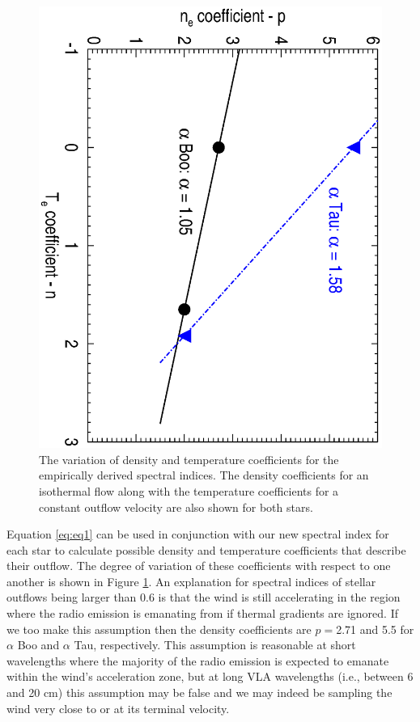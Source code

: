 \documentclass[iop]{emulateapj}
\begin{document}
\begin{figure}
\includegraphics[trim = 0mm 10mm 0mm 20mm, clip,scale=0.385,angle=90]{fig4.ps}
\caption{The variation of density and temperature coefficients for the empirically derived spectral indices. The density coefficients for an isothermal flow along with the temperature coefficients for a constant outflow velocity are also shown for both stars.}
\label{fig:fig4}
\end{figure}

Equation \ref{eq:eq1} can be used in conjunction with our new spectral index for each star to calculate possible density and temperature coefficients that describe their outflow. The degree of variation of these coefficients with respect to one another is shown in Figure \ref{fig:fig4}. An explanation for spectral indices of stellar outflows being larger than 0.6 is that the wind is still accelerating in the region where the radio emission is emanating from if thermal gradients are ignored. If we too make this assumption then the density coefficients are $p=$2.71 and 5.5 for $\alpha$ Boo  and $\alpha$ Tau, respectively. This assumption is reasonable at short wavelengths where the majority of the radio emission is expected to emanate within the wind's acceleration zone, but at long VLA wavelengths (i.e., between 6 and 20 cm) this assumption may be false and we may indeed be sampling the wind very close to or at its terminal velocity. 
\end{document}
